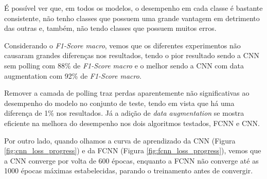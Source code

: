 \documentclass[12pt]{article}
\begin{document}
É possível ver que, em todos os modelos, o desempenho em cada classe é bastante consistente, não tenho classes que possuem uma grande vantagem em detrimento das outras e, também, não tendo classes que possuem muitos erros. 

Considerando o \textit{F1-Score macro}, vemos que os diferentes experimentos não causaram grandes diferenças nos resultados, tendo o pior resultado sendo a CNN sem polling com 88\% de \textit{F1-Score macro} e o melhor sendo a CNN com data augmentation com 92\% de \textit{F1-Score macro}.

Remover a camada de polling traz perdas aparentemente não significativas ao desempenho do modelo no conjunto de teste, tendo em vista que há uma diferença de 1\% nos resultados. Já a adição de \textit{data augmentation} se mostra eficiente na melhora do desempenho nos dois algoritmos testados, FCNN e CNN. 


Por outro lado, quando olhamos a curva de aprendizado da CNN (Figura \ref{fig:cnn_loss_progress}) e da FCNN (Figura \ref{fig:fcnn_loss_progress}), vemos que a CNN converge por volta de 600 épocas, enquanto a FCNN não converge até as 1000 épocas máximas estabelecidas, parando o treinamento antes de convergir.
\end{document}
